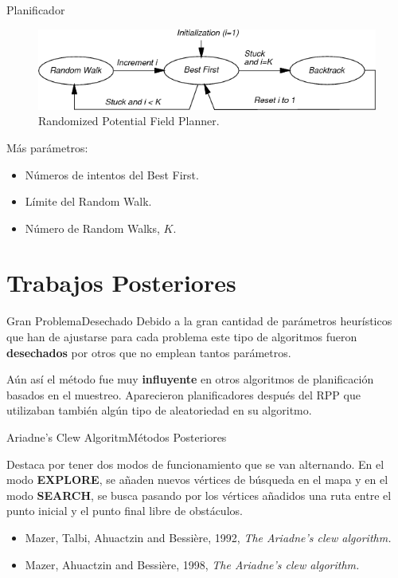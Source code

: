 \documentclass{beamer}
\begin{document}
\begin{frame}{Planificador}
	\begin{figure}[h!]
		\centering
		\includegraphics[width=1.0\linewidth]{images/planner.png}
		\caption{Randomized Potential Field Planner.}
		\label{RPP}
	\end{figure}
	
Más parámetros:

\begin{itemize}
\item Números de intentos del Best First.
\item Límite del Random Walk.
\item Número de Random Walks, $K$.
\end{itemize}
\end{frame}

\section{Trabajos Posteriores}

\begin{frame}{Gran Problema}{Desechado}
Debido a la gran cantidad de parámetros heurísticos que han de ajustarse para cada problema este tipo de algoritmos fueron \textbf{desechados} por otros que no emplean tantos parámetros.\\

\medskip

Aún así el método fue muy \textbf{influyente} en otros algoritmos de planificación basados en el muestreo. Aparecieron planificadores después del RPP que utilizaban también algún tipo de aleatoriedad en su algoritmo.
	
\end{frame}

\begin{frame}{Ariadne's Clew Algoritm}{Métodos Posteriores}

Destaca por tener dos modos de funcionamiento que se van alternando. En el modo \textbf{EXPLORE}, se añaden nuevos vértices de búsqueda en el mapa y en el modo \textbf{SEARCH}, se busca pasando por los vértices añadidos una ruta entre el punto inicial y el punto final libre de obstáculos.

\begin{itemize}
\item Mazer, Talbi, Ahuactzin and Bessière, 1992, \textit{The Ariadne's clew algorithm.}
\item Mazer, Ahuactzin and Bessière, 1998, \textit{The Ariadne's clew algorithm.}
\end{itemize}

\end{frame}
\end{document}

